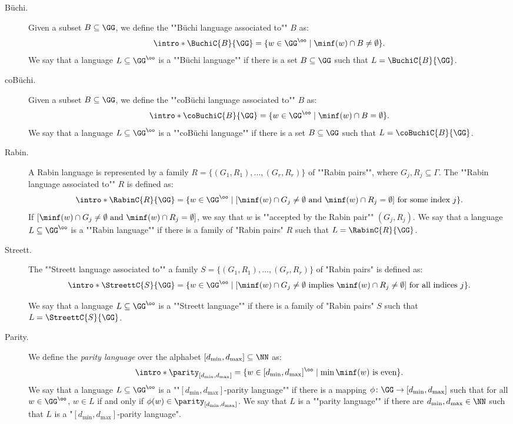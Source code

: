 \documentclass[10pt,a4paper]{amsart}
\begin{document}
\begin{description}	
	\item[Büchi.] \AP Given a subset $B\subseteq \GG$, we define the ""Büchi language associated to"" $B$ as:
	\[ \intro*\BuchiC{B}{\GG}  = \{w\in \GG^\oo \mid \minf(w) \cap B \neq \emptyset\}. \]
	\AP We say that a language $L\subseteq \GG^\oo$ is a ""B\"uchi language"" if there is a set $B\subseteq \GG$ such that $L = \BuchiC{B}{\GG}$.
	
	
	
	\item[coB\"uchi.] \AP Given a subset $B\subseteq \GG$, we define the ""coB\"uchi language associated to"" $B$ as:
	\[ \intro*\coBuchiC{B}{\GG}  = \{w\in \GG^\oo \mid \minf(w) \cap B = \emptyset\}. \]
	\AP We say that a language $L\subseteq \GG^\oo$ is a ""coB\"uchi language"" if there is a set $B\subseteq \GG$ such that $L = \coBuchiC{B}{\GG}$.
	
	\item[Rabin.] \AP A Rabin language is represented by a family $R=\{(G_1,R_1),\dots,(G_r,R_r)\}$  of ""Rabin pairs"", where $G_j,R_j\subseteq \Gamma$.
	The ""Rabin language associated to"" $R$ is defined as:
	\[ \intro*\RabinC{R}{\GG} = \{w\in \GG^\oo \mid [\minf(w)\cap G_j \neq \emptyset \text{ and } \minf(w)\cap R_j = \emptyset] \text{ for some index } j \}. \]
	\AP If $[\minf(w)\cap G_j \neq \emptyset \text{ and } \minf(w)\cap R_j = \emptyset]$, we say that $w$ is ""accepted by the Rabin pair"" $(G_j, R_j)$.
	\AP We say that a language $L\subseteq \GG^\oo$ is a ""Rabin language"" if there is a family of "Rabin pairs" $R$ such that $L = \RabinC{R}{\GG}$.
	
	
	\item[Streett.] \AP The ""Streett language associated to"" a family  $S=\{(G_1,R_1),\dots,(G_r,R_r)\}$ of "Rabin pairs" is defined as:
	\[ \intro*\StreettC{S}{\GG} = \{w\in \GG^\oo \mid [\minf(w)\cap G_j \neq \emptyset \text{ implies } \minf(w)\cap R_j \neq \emptyset] \text{ for all indices } j \}. \]
	
	\AP We say that a language $L\subseteq \GG^\oo$ is a ""Streett language"" if there is a family of "Rabin pairs" $S$ such that $L = \StreettC{S}{\GG}$.
	
	\item[Parity.] \AP We define the \emph{parity language} over the alphabet $[d_{\min}, d_{\max}]\subseteq \NN$ %
	 as:
	\[ \intro*\parity_{[d_{\min}, d_{\max}]} = \{ w\in [d_{\min}, d_{\max}]^\oo \mid \min \minf(w) \text{ is even}\}.\]
	\AP We say that a language $L\subseteq \GG^\oo$ is a ""$[d_{\min}, d_{\max}]$-parity language"" if there is a mapping $\phi\colon \GG \to [d_{\min}, d_{\max}]$ such that for all $w\in \GG^\oo$, $w\in L$ if and only if $\phi(w)\in \parity_{[d_{\min}, d_{\max}]}$. We say that $L$ is a ""parity language"" if there are $d_{\min}, d_{\max}\in \NN$ such that $L$ is a "$[d_{\min}, d_{\max}]$-parity language".


\end{description}
\end{document}
